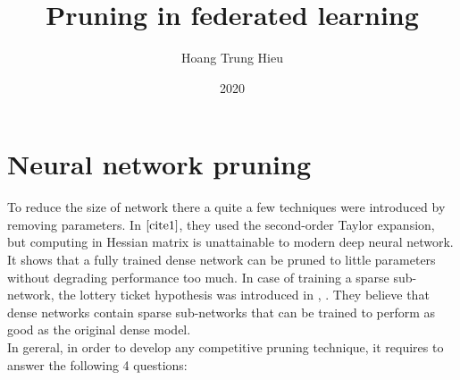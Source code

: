 \documentclass{article}
\theoremstyle{theorem}
\theoremstyle{definition}
\begin{document}
	\newpage
	\title{Pruning in federated learning}
	
	\author{Hoang Trung Hieu
	}                      
	\date{2020}
	\maketitle
	
	\noindent
	\begin{abstract}		
	\end{abstract}

	\section{Neural network pruning}
	To reduce the size of network there a quite a few techniques were introduced by removing parameters. In $\cite{cite1}$, they used the second-order Taylor expansion, but computing in Hessian matrix is unattainable to modern deep neural network. It shows that a fully trained dense network can be pruned to little parameters without degrading performance too much. In case of training a sparse sub-network, the lottery ticket hypothesis was introduced in  \cite{cite3}, \cite{cite4}. They believe that dense networks contain sparse sub-networks that can be trained to perform as good as the original dense model.\\
	In gereral, in order to develop any competitive pruning technique, it requires to answer the following 4 questions:
\end{document}
